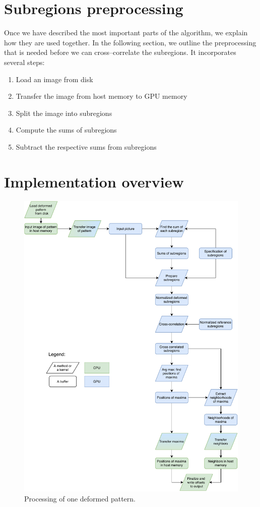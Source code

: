 \section{Subregions preprocessing}
Once we have described the most important parts of the algorithm, we explain how they are used together. In the following section, we outline the preprocessing that is needed before we can cross--correlate the subregions. It incorporates several steps:
\begin{enumerate}
	\item Load an image from disk
	\item Transfer the image from host memory to GPU memory
	\item Split the image into subregions
	\item Compute the sums of subregions
	\item Subtract the respective sums from subregions
\end{enumerate}




\section{Implementation overview}

\begin{figure}
	\centering
	\includegraphics[width=\textwidth]{img/overview}
	\caption{Processing of one deformed pattern.}
	\label{overview}
\end{figure}

